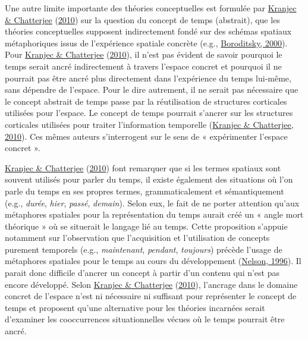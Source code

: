 \documentclass[
  a4paper,12pt,twoside,onecolumn,openright,final,oldfontcommands]{memoir}
\begin{document}
Une autre limite importante des théories conceptuelles est formulée par \protect\hyperlink{ref-kranjec_are_2010}{Kranjec \& Chatterjee} (\protect\hyperlink{ref-kranjec_are_2010}{2010}) sur la question du concept de temps (abstrait), que les théories conceptuelles supposent indirectement fondé sur des schémas spatiaux métaphoriques issus de l'expérience spatiale concrète (e.g., \protect\hyperlink{ref-boroditsky_metaphoric_2000}{Boroditsky, 2000}). Pour \protect\hyperlink{ref-kranjec_are_2010}{Kranjec \& Chatterjee} (\protect\hyperlink{ref-kranjec_are_2010}{2010}), il n'est pas évident de savoir pourquoi le temps serait ancré indirectement à travers l'espace concret et pourquoi il ne pourrait pas être ancré plus directement dans l'expérience du temps lui-même, sans dépendre de l'espace. Pour le dire autrement, il ne serait pas nécessaire que le concept abstrait de temps passe par la réutilisation de structures corticales utilisées pour l'espace. Le concept de temps pourrait s'ancrer sur les structures corticales utilisées pour traiter l'information temporelle (\protect\hyperlink{ref-kranjec_are_2010}{Kranjec \& Chatterjee, 2010}). Ces mêmes auteurs s'interrogent sur le sens de « expérimenter l'espace concret ».

\protect\hyperlink{ref-kranjec_are_2010}{Kranjec \& Chatterjee} (\protect\hyperlink{ref-kranjec_are_2010}{2010}) font remarquer que si les termes spatiaux sont souvent utilisés pour parler du temps, il existe également des situations où l'on parle du temps en ses propres termes, grammaticalement et sémantiquement (e.g., \emph{durée}, \emph{hier}, \emph{passé}, \emph{demain}). Selon eux, le fait de ne porter attention qu'aux métaphores spatiales pour la représentation du temps aurait créé un « angle mort théorique » où se situerait le langage lié au temps. Cette proposition s'appuie notamment sur l'observation que l'acquisition et l'utilisation de concepts purement temporels (e.g., \emph{maintenant}, \emph{pendant}, \emph{toujours}) précède l'usage de métaphores spatiales pour le temps au cours du développement (\protect\hyperlink{ref-nelson_language_1996}{Nelson, 1996}). Il parait donc difficile d'ancrer un concept à partir d'un contenu qui n'est pas encore développé. Selon \protect\hyperlink{ref-kranjec_are_2010}{Kranjec \& Chatterjee} (\protect\hyperlink{ref-kranjec_are_2010}{2010}), l'ancrage dans le domaine concret de l'espace n'est ni nécessaire ni suffisant pour représenter le concept de temps et proposent qu'une alternative pour les théories incarnées serait d'examiner les cooccurrences situationnelles vécues où le temps pourrait être ancré.
\end{document}

